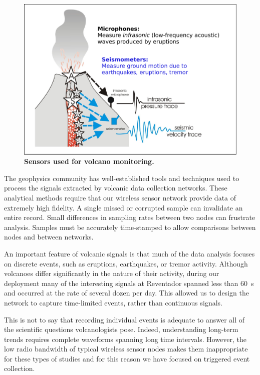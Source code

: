 \begin{figure}[t] 
\begin{center} 
\includegraphics[width=0.9\hsize]{./2-related/figs/NewCartoon.pdf}
\end{center} 
\caption{\textbf{Sensors used for volcano monitoring.}}
\label{introduction-fig-cartoon} 
\end{figure}

The geophysics community has well-established tools and techniques used to
process the signals extracted by volcanic data collection networks. These
analytical methods require that our wireless sensor network provide data of
extremely high fidelity. A single missed or corrupted sample can invalidate
an entire record. Small differences in sampling rates between two nodes can
frustrate analysis. Samples must be accurately time-stamped to allow
comparisons between nodes and between networks.

An important feature of volcanic signals is that much of the data analysis
focuses on discrete events, such as eruptions, earthquakes, or tremor
activity. Although volcanoes differ significantly in the nature of their
activity, during our deployment many of the interesting signals at Reventador
spanned less than 60~s and occurred at the rate of several dozen per day.
This allowed us to design the network to capture time-limited events, rather
than continuous signals. 

This is not to say that recording individual events is adequate to answer all
of the scientific questions volcanologists pose. Indeed, understanding
long-term trends requires complete waveforms spanning long time intervals.
However, the low radio bandwidth of typical wireless sensor nodes makes them
inappropriate for these types of studies and for this reason we have focused
on triggered event collection.

